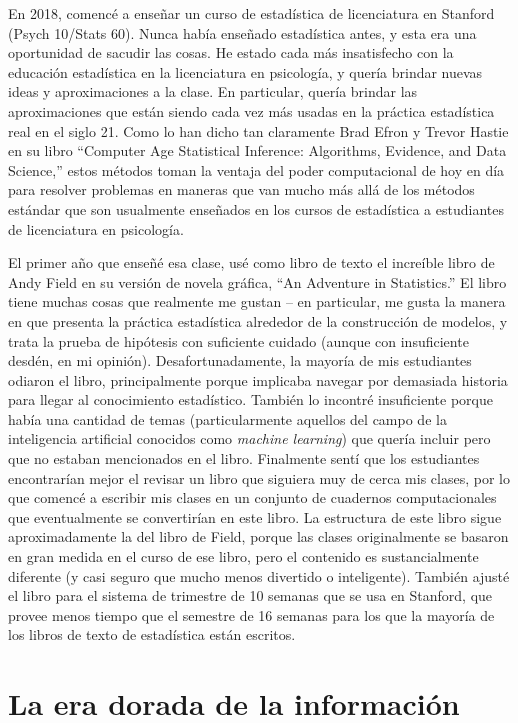 \documentclass[
  12pt,
]{book}
\theoremstyle{definition}
\theoremstyle{definition}
\theoremstyle{definition}
\theoremstyle{remark}
\begin{document}
En 2018, comencé a enseñar un curso de estadística de licenciatura en Stanford (Psych 10/Stats 60). Nunca había enseñado estadística antes, y esta era una oportunidad de sacudir las cosas. He estado cada más insatisfecho con la educación estadística en la licenciatura en psicología, y quería brindar nuevas ideas y aproximaciones a la clase. En particular, quería brindar las aproximaciones que están siendo cada vez más usadas en la práctica estadística real en el siglo 21. Como lo han dicho tan claramente Brad Efron y Trevor Hastie en su libro ``Computer Age Statistical Inference: Algorithms, Evidence, and Data Science,'' estos métodos toman la ventaja del poder computacional de hoy en día para resolver problemas en maneras que van mucho más allá de los métodos estándar que son usualmente enseñados en los cursos de estadística a estudiantes de licenciatura en psicología.

El primer año que enseñé esa clase, usé como libro de texto el increíble libro de Andy Field en su versión de novela gráfica, ``An Adventure in Statistics.'' El libro tiene muchas cosas que realmente me gustan -- en particular, me gusta la manera en que presenta la práctica estadística alrededor de la construcción de modelos, y trata la prueba de hipótesis con suficiente cuidado (aunque con insuficiente desdén, en mi opinión). Desafortunadamente, la mayoría de mis estudiantes odiaron el libro, principalmente porque implicaba navegar por demasiada historia para llegar al conocimiento estadístico. También lo incontré insuficiente porque había una cantidad de temas (particularmente aquellos del campo de la inteligencia artificial conocidos como \emph{machine learning}) que quería incluir pero que no estaban mencionados en el libro. Finalmente sentí que los estudiantes encontrarían mejor el revisar un libro que siguiera muy de cerca mis clases, por lo que comencé a escribir mis clases en un conjunto de cuadernos computacionales que eventualmente se convertirían en este libro. La estructura de este libro sigue aproximadamente la del libro de Field, porque las clases originalmente se basaron en gran medida en el curso de ese libro, pero el contenido es sustancialmente diferente (y casi seguro que mucho menos divertido o inteligente). También ajusté el libro para el sistema de trimestre de 10 semanas que se usa en Stanford, que provee menos tiempo que el semestre de 16 semanas para los que la mayoría de los libros de texto de estadística están escritos.

\hypertarget{la-era-dorada-de-la-informaciuxf3n}{%
\section{La era dorada de la información}\label{la-era-dorada-de-la-informaciuxf3n}}
\end{document}
